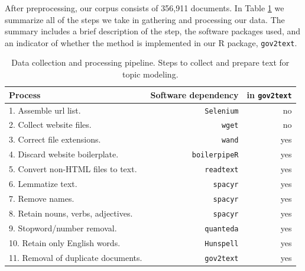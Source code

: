 \documentclass[11pt]{article}
\begin{document}
After preprocessing, our corpus consists of 356,911 documents.  In Table \ref{tab:list} we summarize all of the steps we take in gathering and processing our data. The summary includes a brief description of the step, the software packages used, and an indicator of whether the method is implemented in our R package, \texttt{gov2text}. 

\begin{table}[ht]
    \centering
    \begin{tabular}{lrr}
        \hline
        Process & Software dependency & in \texttt{gov2text} \\
        \hline
        1. Assemble url list. & \texttt{Selenium} & no \\
        2. Collect website files. & \texttt{wget} & no \\
        3. Correct file extensions. & \texttt{wand} \citep{wand} & yes \\
        4. Discard website boilerplate. & \texttt{boilerpipeR} \citep{boilerpipeR} & yes \\
        5. Convert non-HTML files to text. & \texttt{readtext} \citep{readtext} & yes \\
        6. Lemmatize text. & \texttt{spacyr} \citep{spacyr}& yes \\
        7. Remove names. & \texttt{spacyr} & yes \\
        8. Retain nouns, verbs, adjectives. & \texttt{spacyr} & yes \\
        9. Stopword/number removal. & \texttt{quanteda} \citep{quanteda} & yes \\ 
        10. Retain only English words. & \texttt{Hunspell} \citep{hunspell} & yes \\
        11. Removal of duplicate documents. & \texttt{gov2text} & yes \\
        \hline
    \end{tabular}
    \caption{\label{tab:list} Data collection and processing pipeline. Steps to collect and prepare text for topic modeling.} 
\end{table}


\end{document}
